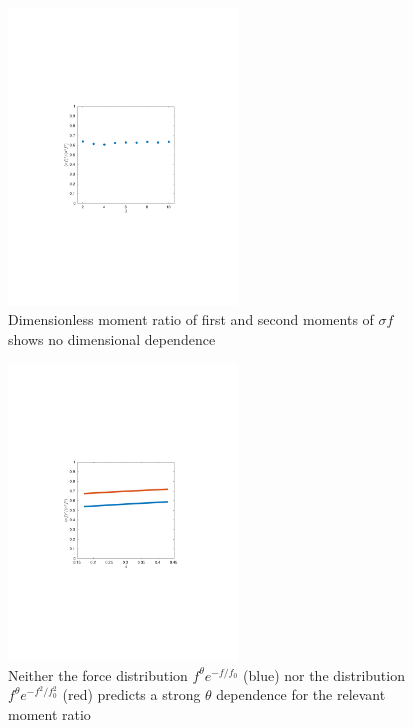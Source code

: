 \begin{figure}[h!]
    \includegraphics[width=230px, trim=133 242 168 254, clip]{excessContactsScaling/mfr.pdf}
    \caption{Dimensionless moment ratio of first and second moments of $\sigma f$ shows no dimensional dependence}
     \label{plot:mfr}
\end{figure}
\begin{figure}[h!]
    \includegraphics[width=230px, trim=143 240 163 250, clip]{excessContactsScaling/theoryMFR.pdf}
    \caption{Neither the force distribution $f^\theta e^{-f/f_0}$  (blue) nor the distribution $f^\theta e^{-f^2/f_0^2}$  (red) predicts a strong $\theta$ dependence for the relevant moment ratio}
    \label{plot:theory_mfr}
\end{figure}




